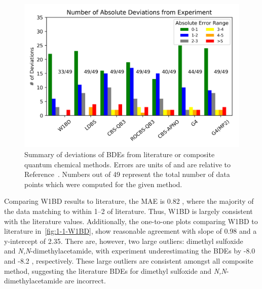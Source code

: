 \begin{figure}[H]
  \centering
  \includegraphics[width=\textwidth]{figures/bde-barchart}
  \caption[Summary of deviations of BDEs from literature for composite quantum chemical methods.]{Summary of deviations of BDEs from literature or composite quantum chemical methods. Errors are units of \kcalmol and are relative to Reference~\protect{}. Numbers out of 49 represent the total number of data points which were computed for the given method.}
  \label{fig:maebarchart}
\end{figure}

Comparing W1BD results to literature, the MAE is 0.82 \kcalmol, where the majority of the data matching to within 1--2 \kcalmol of literature. Thus, W1BD is largely consistent with the literature values. Additionally, the one-to-one plots comparing W1BD to literature in~\ref{fig:1-1-W1BD}, show reasonable agreement with slope of 0.98 and a y-intercept of 2.35. There are, however, two large outliers: dimethyl sulfoxide\footnotemark~ and \emph{N,N}-dimethylacetamide, with experiment underestimating the BDEs by -8.0 and -8.2 \kcalmol, respectively. These large outliers are consistent amongst all composite method, suggesting the literature BDEs for dimethyl sulfoxide and \emph{N,N}-dimethylacetamide are incorrect.


